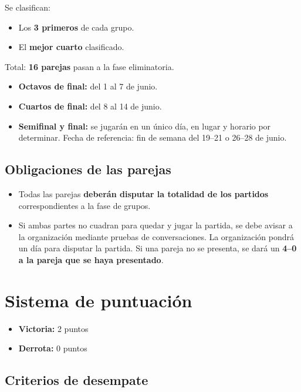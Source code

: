 \documentclass[11pt,a4paper]{article}
\begin{document}
Se clasifican:
\begin{itemize}
    \item Los \textbf{3 primeros} de cada grupo.
    \item El \textbf{mejor cuarto} clasificado.
\end{itemize}

Total: \textbf{16 parejas} pasan a la fase eliminatoria.

\begin{itemize}
    \item \textbf{Octavos de final:} del 1 al 7 de junio.
    \item \textbf{Cuartos de final:} del 8 al 14 de junio.
    \item \textbf{Semifinal y final:} se jugarán en un único día, en lugar y horario por determinar. Fecha de referencia: fin de semana del 19--21 o 26--28 de junio.
\end{itemize}

\subsection{Obligaciones de las parejas}

\begin{itemize}
    \item Todas las parejas \textbf{deberán disputar la totalidad de los partidos} correspondientes a la fase de grupos.
    \item Si ambas partes no cuadran para quedar y jugar la partida, se debe avisar a la organización mediante pruebas de conversaciones. La organización pondrá un día para disputar la partida. Si una pareja no se presenta, se dará un \textbf{4--0 a la pareja que se haya presentado}.
\end{itemize}

\section{Sistema de puntuación}

\begin{itemize}
    \item \textbf{Victoria:} 2 puntos
    \item \textbf{Derrota:} 0 puntos
\end{itemize}

\subsection{Criterios de desempate}
\end{document}
